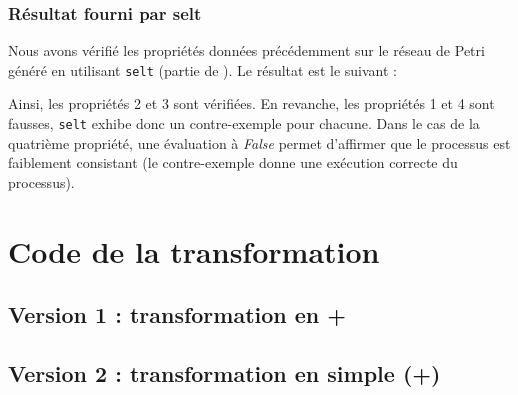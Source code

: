 \pagebreak

\subsubsection{Résultat fourni par {\textsf{selt}\xspace}}

Nous avons vérifié les propriétés données précédemment sur le réseau de Petri
généré en utilisant \texttt{selt} (partie de {\tina}). Le résultat est le
suivant : 


Ainsi, les propriétés 2 et 3 sont vérifiées. En revanche, les propriétés 1 et 4
sont fausses, \texttt{selt} exhibe donc un contre-exemple pour chacune. Dans le
cas de la quatrième propriété, une évaluation à \emph{False} permet d'affirmer
que le processus est faiblement consistant (le contre-exemple donne une
exécution correcte du processus).



\section{Code de la transformation}
\label{annexe:flattening}

\subsection{Version 1 : transformation en {\java}+{\emf}}
\label{annexe:flattening:v1}
%


%

\subsection{Version 2 : transformation en {\tomjava} simple (+{\emf})}
\label{annexe:flattening:v2}
%

